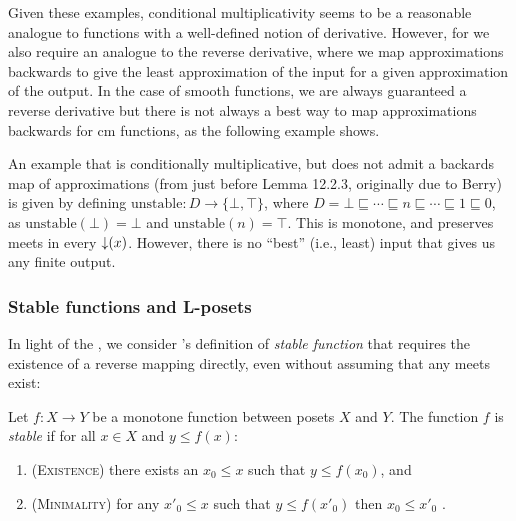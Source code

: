 Given these examples, conditional multiplicativity seems to be a reasonable analogue to functions with a well-defined notion of derivative. However, for \GPS we also require an analogue to the reverse derivative, where we map approximations backwards to give the least approximation of the input for a given approximation of the output. In the case of smooth functions, we are always guaranteed a reverse derivative but there is not always a best way to map approximations backwards for cm functions, as the following example shows.

\begin{example}
  \label{ex:non-stable-function}
  An example that is conditionally multiplicative, but does not admit
  a backards map of approximations (from \citet{amadio-curien} just
  before Lemma 12.2.3, originally due to Berry) is given by defining
  $\mathrm{unstable} : D \to \{\bot, \top\}$, where
  $D = \bot \sqsubseteq \cdots \sqsubseteq n \sqsubseteq \cdots
  \sqsubseteq 1 \sqsubseteq 0$, as $\mathrm{unstable}(\bot) = \bot$
  and $\mathrm{unstable}(n) = \top$. This is monotone, and preserves
  meets in every $\mathop{\downarrow}(x)$. However, there is no ``best'' (i.e.,
  least) input that gives us any finite output.
\end{example}

\subsubsection{Stable functions and L-posets}

In light of the , we consider
\citet{berry79}'s definition of \emph{stable function} that requires
the existence of a reverse mapping directly, even without assuming
that any meets exist:

\begin{definition}
  Let $f : X \to Y$ be a monotone function between posets $X$ and
  $Y$. The function $f$ is \emph{stable} if for all $x \in X$ and
  $y \leq f(x)$:
  \begin{enumerate}
  \item (\textsc{Existence}) there exists an $x_0 \leq x$ such that $y \leq f(x_0)$, and
  \item (\textsc{Minimality}) for any $x'_0 \leq x$ such that $y \leq f(x'_0)$ then
    $x_0 \leq x'_0$ .
  \end{enumerate}
\end{definition}

